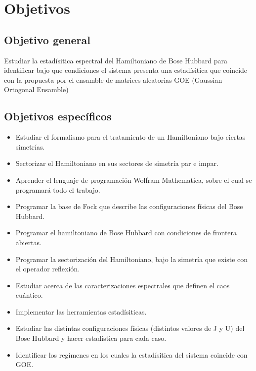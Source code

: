 \documentclass[spanish,titlepage,table]{practicas}
\begin{document}
\section{Objetivos}\label{sec:objetivos}
\subsection{Objetivo general}
Estudiar la estadísitica espectral del Hamiltoniano de Bose Hubbard para identificar bajo que condiciones 
el sistema presenta una estadísitica  que coincide con la propuesta por el ensamble de matrices aleatorias GOE (Gaussian Ortogonal Ensamble)
\subsection{Objetivos específicos}
\begin{itemize}
\item Estudiar el formalismo para el tratamiento de un Hamiltoniano bajo ciertas simetrías.
\item Sectorizar el Hamiltoniano en sus sectores de simetría par e impar.
\item Aprender el lenguaje de programación Wolfram Mathematica, sobre el cual se programará todo el trabajo.
\item Programar la base de Fock que describe las configuraciones físicas del Bose Hubbard.
\item Programar el hamiltoniano de Bose Hubbard con condiciones de frontera abiertas.
\item Programar la sectorización del Hamiltoniano, bajo la simetría que existe con el operador reflexión.
\item Estudiar acerca de las caracterizaciones espectrales que definen el caos cuántico. 
\item Implementar las herramientas estadísiticas.
\item Estudiar las distintas configuraciones físicas (distintos valores de J y U) del Bose Hubbard y hacer estadística para cada caso.
\item Identificar los regímenes en los cuales la estadísitica del sistema coincide con GOE.
\end{itemize}
\end{document}
